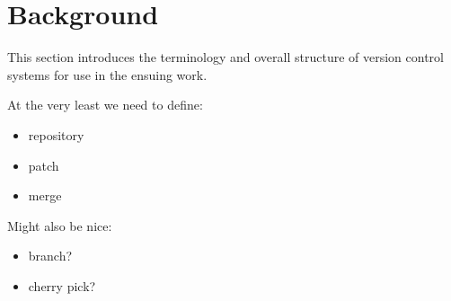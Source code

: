 \section{Background}

This section introduces the terminology and overall structure of version control
systems for use in the ensuing work.

At the very least we need to define:
\begin{itemize}
  \item repository
  \item patch
  \item merge
\end{itemize}

Might also be nice:
\begin{itemize}
  \item branch?
  \item cherry pick?
\end{itemize}